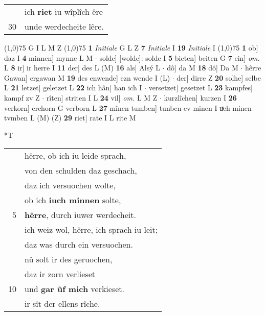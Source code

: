 \documentclass[8pt,a4paper,notitlepage]{article}
\begin{document}
\begin{table}[ht]
\begin{minipage}[t]{0.5\linewidth}
\begin{tabular}{rl}
 & ich \textbf{riet} iu wîplîch êre\\ 
30 & unde werdecheite lêre.\\ 
\end{tabular}
\scriptsize
\line(1,0){75} \newline
G I L M Z \newline
\line(1,0){75} \newline
\textbf{1} \textit{Initiale} G L Z  \textbf{7} \textit{Initiale} I  \textbf{19} \textit{Initiale} I  \newline
\line(1,0){75} \newline
\textbf{1} ob] daz I \textbf{4} minnen] mynne L M  $\cdot$ solde] [wolde]: solde I \textbf{5} bieten] beiten G \textbf{7} ein] \textit{om.} L \textbf{8} ir] ir herre I \textbf{11} der] des L (M) \textbf{16} als] Alsý L  $\cdot$ dô] da M \textbf{18} dô] Da M  $\cdot$ hêrre Gawan] ergawan M \textbf{19} des enwende] ezn wende I (L)  $\cdot$ der] dirre Z \textbf{20} solhe] selbe L \textbf{21} letzet] geletzet L \textbf{22} ich hân] han ich I  $\cdot$ versetzet] gesetzet L \textbf{23} kampfes] kampf zv Z  $\cdot$ rîten] striten I L \textbf{24} vil] \textit{om.} L M Z  $\cdot$ kurzlîchen] kurzen I \textbf{26} verkorn] erchorn G verborn L \textbf{27} mînen tumben] tunben ev minen I uͯch minen tvmben L (M) (Z) \textbf{29} riet] rate I L rite M \newline
\end{minipage}
\hspace{0.5cm}
\begin{minipage}[t]{0.5\linewidth}
\small
\begin{center}*T
\end{center}
\begin{tabular}{rl}
 & hêrre, ob ich iu leide sprach,\\ 
 & von den schulden daz geschach,\\ 
 & daz ich versuochen wolte,\\ 
 & ob ich \textbf{iuch minnen} solte,\\ 
5 & \textbf{hêrre}, durch iuwer werdecheit.\\ 
 & ich weiz wol, hêrre, ich sprach iu leit;\\ 
 & daz was durch ein versuochen.\\ 
 & nû solt ir des geruochen,\\ 
 & daz ir zorn verlieset\\ 
10 & und \textbf{gar ûf mich} verkieset.\\ 
 & ir sît der ellens rîche.\\ 

\end{tabular}
\end{minipage}
\end{table}
\end{document}
